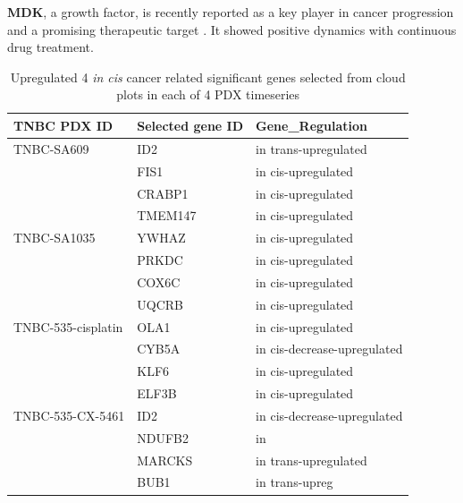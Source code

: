 














\textbf{MDK}, a growth factor, is recently reported as a key player in cancer progression and a promising therapeutic target \cite{filippou2020midkine}. It showed positive dynamics with continuous drug treatment. 


\begin{table}[htbp]
   \centering
   \caption{Upregulated 4 \textit{in cis} cancer related significant genes selected from cloud plots in each of 4 PDX timeseries}
     \begin{tabular}{|r|l|l|}
     \hline
     \multicolumn{1}{|l|}{TNBC PDX ID} & Selected gene ID & Gene\_Regulation \\
     \hline
     \multicolumn{1}{|l|}{TNBC-SA609} & ID2 & in trans-upregulated \\
       & FIS1  & in cis-upregulated \\
       & CRABP1  & in cis-upregulated \\
       & TMEM147  & in cis-upregulated \\
     \multicolumn{1}{|l|}{TNBC-SA1035} & YWHAZ & in cis-upregulated  \\
       & PRKDC  & in cis-upregulated \\
       & COX6C  & in cis-upregulated \\
       & UQCRB  & in cis-upregulated \\
     \multicolumn{1}{|l|}{TNBC-535-cisplatin} & OLA1  & in cis-upregulated \\
       & CYB5A  & in cis-decrease-upregulated \\
       & KLF6   & in cis-upregulated \\
       & ELF3B  & in cis-upregulated \\
     \multicolumn{1}{|l|}{TNBC-535-CX-5461} & ID2  & in cis-decrease-upregulated \\
       & NDUFB2 & in  \\
       & MARCKS  & in trans-upregulated \\
       & BUB1  & in trans-upreg \\
       \hline
    \end{tabular}%
  \label{tab:selected4genestable}%
  \end{table}%

























